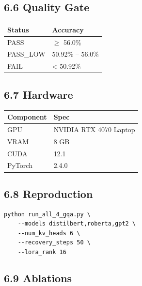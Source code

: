 \subsection{6.6 Quality Gate}

\begin{table}[H]
\centering
\small
\begin{tabular}{ll}
\toprule
\textbf{Status} & \textbf{Accuracy} \\
\midrule
PASS & $\ge$ 56.0\% \\
PASS\_LOW & 50.92\% -- 56.0\% \\
FAIL & < 50.92\% \\
\bottomrule
\end{tabular}
\end{table}

\subsection{6.7 Hardware}

\begin{table}[H]
\centering
\small
\begin{tabular}{ll}
\toprule
\textbf{Component} & \textbf{Spec} \\
\midrule
GPU & NVIDIA RTX 4070 Laptop \\
VRAM & 8 GB \\
CUDA & 12.1 \\
PyTorch & 2.4.0 \\
\bottomrule
\end{tabular}
\end{table}

\subsection{6.8 Reproduction}

\begin{lstlisting}
python run_all_4_gqa.py \
    --models distilbert,roberta,gpt2 \
    --num_kv_heads 6 \
    --recovery_steps 50 \
    --lora_rank 16
\end{lstlisting}

\subsection{6.9 Ablations}
